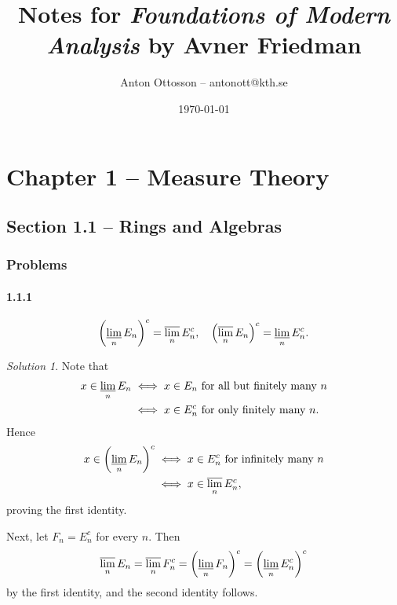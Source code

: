\documentclass{report}
\title{Notes for \textit{Foundations of Modern Analysis} by Avner Friedman}
\author{Anton Ottosson -- antonott@kth.se}
\date{\today}
\theoremstyle{remark}
\newtheorem*{solution}{Solution}
\begin{document}
\maketitle

\chapter*{Chapter 1 -- Measure Theory}

\section*{Section 1.1 -- Rings and Algebras}

\subsection*{Problems}

\subsubsection*{1.1.1}
\begin{equation*}
  \left( \varliminf_n E_n \right)^c = \varlimsup_n E_n^c, \quad \left( \varlimsup_n E_n \right)^c = \varliminf_n E_n^c.
\end{equation*}

\begin{solution}
  Note that
  \begin{equation*}
    \begin{split}
      x \in \varliminf_n E_n &\iff \text{$x \in E_n$ for all but finitely many $n$} \\
      &\iff \text{$x \in E_n^c$ for only finitely many $n$}.
    \end{split}
  \end{equation*}
  Hence
  \begin{equation*}
    \begin{split}
      x \in \left( \varliminf_n E_n \right)^c &\iff \text{$x \in E_n^c$ for infinitely many $n$} \\
      &\iff x \in \varlimsup_n E_n^c,
    \end{split}
  \end{equation*}
  proving the first identity.

  Next, let $F_n = E_n^c$ for every $n$. Then
  \begin{equation*}
    \varlimsup_n E_n = \varlimsup_n F_n^c = \left( \varliminf_n F_n \right)^c = \left( \varliminf_n E_n^c \right)^c
  \end{equation*}
  by the first identity, and the second identity follows.
\end{solution}
\end{document}
